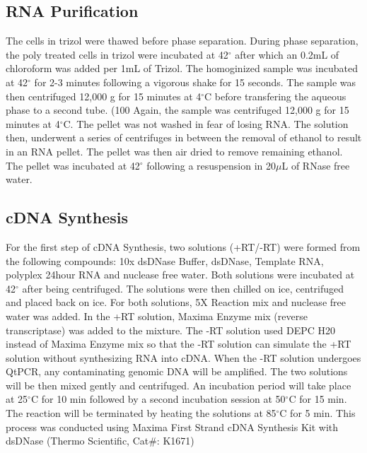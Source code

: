 \documentclass[journal, a4paper]{IEEEtran}
\begin{document}
    \subsection{RNA Purification}
      The cells in trizol were thawed before phase separation. During phase separation,
      the poly treated cells in trizol were incubated at 42$^{\circ}$ after which an 0.2mL of chloroform was added per 1mL of Trizol.
      The homoginized sample was incubated at 42$^{\circ}$ for 2-3 minutes following a vigorous shake for 15 seconds.
      The sample was then centrifuged 12,000 g for 15 minutes at 4$^{\circ}$C before transfering the aqueous phase
      to a second tube. (100%
      Again, the sample was centrifuged 12,000 g for 15 minutes at 4$^{\circ}$C.
      The pellet was not washed in fear of losing RNA.
      The solution then, underwent a series of centrifuges in between the removal of ethanol to result in an RNA pellet.
      The pellet was then air dried to remove remaining ethanol.
      The pellet was incubated at 42$^{\circ}$ following a resuspension in 20$\mu$L of RNase free water.

    \subsection{cDNA Synthesis}
      For the first step of cDNA Synthesis, two solutions (+RT/-RT) were formed from the following compounds:
      10x dsDNase Buffer, dsDNase, Template RNA, polyplex 24hour RNA and nuclease free water.
      Both solutions were incubated at 42$^{\circ}$ after being centrifuged. The solutions were then chilled on ice, centrifuged and placed back on ice.
      For both solutions, 5X Reaction mix and nuclease free water was added. In the +RT solution, Maxima Enzyme mix (reverse transcriptase) was added to the mixture.
      The -RT solution used DEPC H20 instead of Maxima Enzyme mix so that the -RT solution can simulate the +RT solution without synthesizing RNA into cDNA.
      When the -RT solution undergoes QtPCR, any contaminating genomic DNA will be amplified.
      The two solutions will be then mixed gently and centrifuged. An incubation period will take place at 25$^{\circ}$C for 10 min
      followed by a second incubation session at 50$^{\circ}$C for 15 min.
      The reaction will be terminated by heating the solutions at 85$^{\circ}$C for 5 min.
      This process was conducted using Maxima First Strand cDNA Synthesis Kit with dsDNase (Thermo Scientific, Cat#: K1671)
\end{document}
